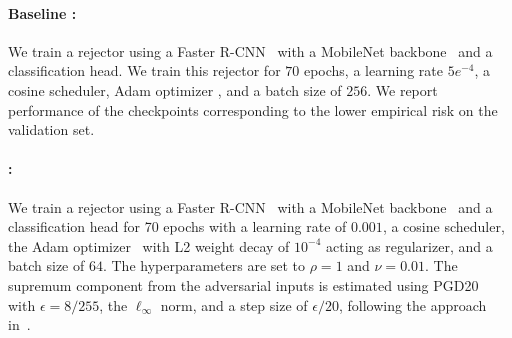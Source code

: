 \begin{appendices}
\paragraph{Baseline \citep{montreuil2024twostagelearningtodefermultitasklearning}:} We train a rejector using a Faster R-CNN~\citep{ren2016fasterrcnnrealtimeobject} with a MobileNet backbone~\citep{howard2017mobilenetsefficientconvolutionalneural} and a classification head. We train this rejector for $70$ epochs, a learning rate $5e^{-4}$, a cosine scheduler, Adam optimizer \citep{kingma2017adammethodstochasticoptimization}, and a batch size of $256$. We report performance of the checkpoints corresponding to the lower empirical risk on the validation set. 

\paragraph{\name{}:} We train a rejector using a Faster R-CNN~\citep{ren2016fasterrcnnrealtimeobject} with a MobileNet backbone~\citep{howard2017mobilenetsefficientconvolutionalneural} and a classification head for 70 epochs with a learning rate of $0.001$, a cosine scheduler, the Adam optimizer~\citep{kingma2017adammethodstochasticoptimization} with L2 weight decay of $10^{-4}$ acting as regularizer, and a batch size of $64$. The hyperparameters are set to $\rho = 1$ and $\nu = 0.01$. The supremum component from the adversarial inputs is estimated using PGD20~\citep{Madry2017TowardsDL} with $\epsilon = 8/255$, the $\ell_\infty$ norm, and a step size of $\epsilon / 20$, following the approach in~\citep{mao2023crossentropylossfunctionstheoretical, Grounded}.



\begin{table}[H]
\centering{}
\caption{Performance comparison of \name{} with the baseline \citep{montreuil2024twostagelearningtodefermultitasklearning} on the Pascal VOC dataset. The table reports mean Average Precision (mAP) under clean and adversarial scenarios.}
\end{table}


\end{appendices}